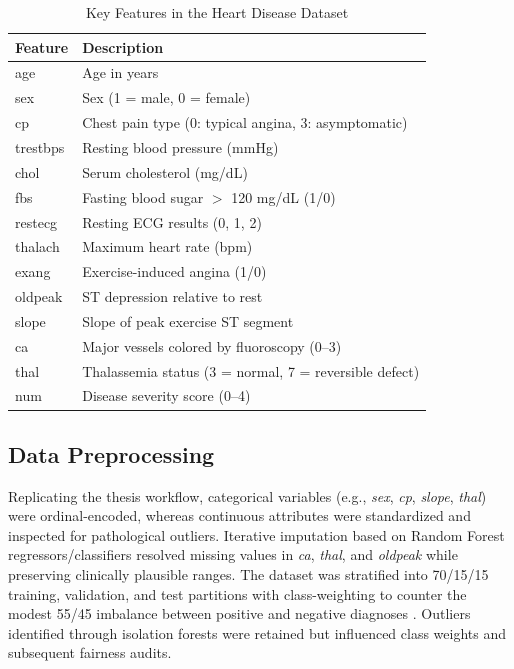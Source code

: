 \documentclass[12pt]{article}
\begin{document}
\begin{table}[t]
  \caption{Key Features in the Heart Disease Dataset}
  \label{tab:features}
  \centering
  \begin{tabular}{p{} p{}}
    \toprule
    Feature & Description \\
    \midrule
    age & Age in years \\
    sex & Sex (1 = male, 0 = female) \\
    cp & Chest pain type (0: typical angina, 3: asymptomatic) \\
    trestbps & Resting blood pressure (mmHg) \\
    chol & Serum cholesterol (mg/dL) \\
    fbs & Fasting blood sugar $>$ 120 mg/dL (1/0) \\
    restecg & Resting ECG results (0, 1, 2) \\
    thalach & Maximum heart rate (bpm) \\
    exang & Exercise-induced angina (1/0) \\
    oldpeak & ST depression relative to rest \\
    slope & Slope of peak exercise ST segment \\
    ca & Major vessels colored by fluoroscopy (0--3) \\
    thal & Thalassemia status (3 = normal, 7 = reversible defect) \\
    num & Disease severity score (0--4) \\
    \bottomrule
  \end{tabular}
\end{table}

\subsection{Data Preprocessing}
Replicating the thesis workflow, categorical variables (e.g., \textit{sex}, \textit{cp}, \textit{slope}, \textit{thal}) were ordinal-encoded, whereas continuous attributes were standardized and inspected for pathological outliers. Iterative imputation based on Random Forest regressors/classifiers resolved missing values in \textit{ca}, \textit{thal}, and \textit{oldpeak} while preserving clinically plausible ranges. The dataset was stratified into 70/15/15 training, validation, and test partitions with class-weighting to counter the modest 55/45 imbalance between positive and negative diagnoses \cite{pedregosa2011scikit, chawla2002smote}. Outliers identified through isolation forests were retained but influenced class weights and subsequent fairness audits.
\end{document}

